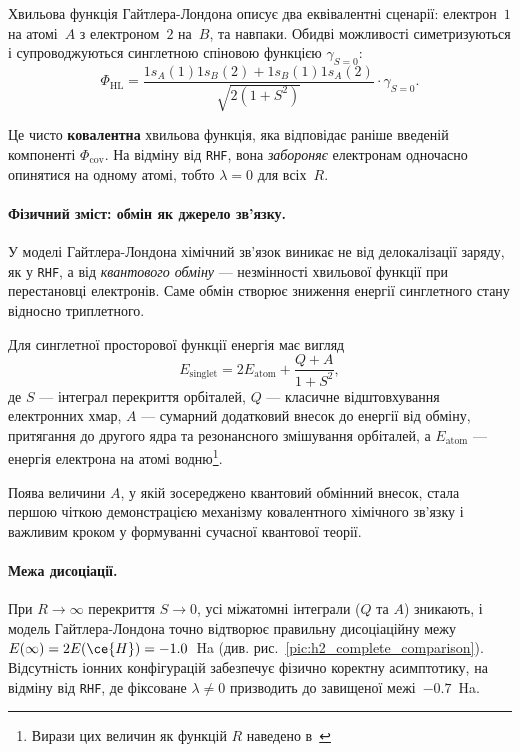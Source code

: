 Хвильова функція Гайтлера-Лондона описує два еквівалентні сценарії:
електрон~$1$ на атомі~$A$ з електроном~$2$ на~$B$, та навпаки.
Обидві можливості симетризуються і супроводжуються синглетною
спіновою функцією $\gamma_{S=0}$:
\[
	\Phi_{\text{HL}}
	=
	\frac{
		1s_A(1)1s_B(2) + 1s_B(1)1s_A(2)
	}{
		\sqrt{2(1+S^2)}
	}
	\cdot \gamma_{S=0}.
\]

Це чисто \textbf{ковалентна} хвильова функція, яка відповідає
раніше введеній компоненті $\Phi_{\mathrm{cov}}$. На відміну від \texttt{RHF},
вона \emph{забороняє} електронам одночасно опинятися на одному атомі,
тобто $\lambda=0$ для всіх~$R$.


\paragraph{Фізичний зміст: обмін як джерело зв'язку.}

У моделі Гайтлера-Лондона хімічний зв'язок виникає не від делокалізації
заряду, як у \texttt{RHF}, а від \emph{квантового обміну} ---
незмінності хвильової функції при перестановці електронів.
Саме обмін створює зниження енергії синглетного стану
відносно триплетного.

Для синглетної просторової функції енергія має вигляд
\[
	E_{\mathrm{singlet}}
	=
	2E_{\text{atom}}
	+
	\frac{Q + A}{1 + S^2},
\]
де \(S\) --- інтеграл перекриття орбіталей,
\(Q\) --- класичне відштовхування електронних хмар,
\(A\) --- сумарний додатковий внесок до енергії від обміну,
притягання до другого ядра та резонансного змішування орбіталей,
а \(E_{\text{atom}}\) --- енергія електрона на атомі водню\footnote{Вирази
	цих величин як функцій $R$ наведено в~}.

Поява величини $A$, у якій зосереджено квантовий обмінний внесок,
стала першою чіткою демонстрацією механізму ковалентного
хімічного зв'язку і важливим кроком у формуванні сучасної
квантової теорії.


\paragraph{Межа дисоціації.}

При $R\to\infty$ перекриття $S\to 0$, усі міжатомні інтеграли
($Q$ та $A$) зникають, і модель Гайтлера-Лондона точно
відтворює правильну дисоціаційну межу $E(\infty)=2E(\ce{H})=-1.0$~Ha
(див. рис.~\ref{pic:h2_complete_comparison}). Відсутність іонних
конфігурацій забезпечує фізично коректну асимптотику, на відміну
від \texttt{RHF}, де фіксоване $\lambda\neq 0$ призводить до
завищеної межі~$-0.7$~Ha.


